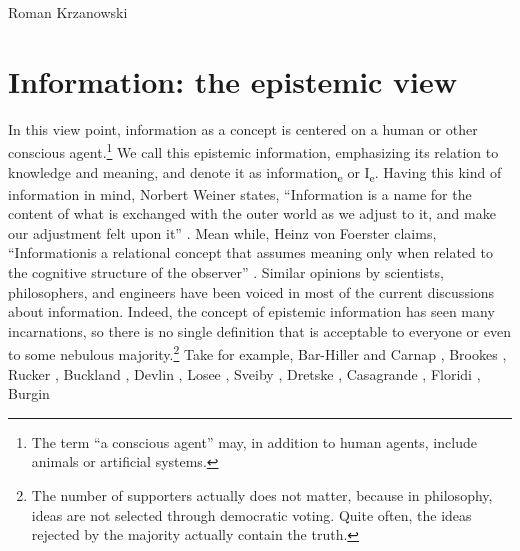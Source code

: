 \begin{artengenv}{Roman Krzanowski}
\section{Information: the epistemic view}
In this view point, information as a concept is centered on a human or other conscious agent.\footnote{The term ``a conscious agent'' may, in addition to human agents, include animals or artificial systems.} We call this epistemic information, emphasizing its relation to knowledge and meaning, and denote it as information\textsubscript{e} or I\textsubscript{e}. Having this kind of information in mind, Norbert Weiner states, ``Information is a name for the content of what is exchanged with the outer world as we adjust to it, and make our adjustment felt upon it''
\parencite[][p.17]{wiener_human_1989}. %
 Mean while, Heinz von Foerster claims, ``Informationis a relational concept that assumes meaning only when related to the cognitive structure of the observer'' 
\parencite[][p.3]{foerster_epistemology_1980}. %
 Similar opinions by scientists, philosophers, and engineers have been voiced in most of the current discussions about information. Indeed, the concept of epistemic information has seen many incarnations, so there is no single definition that is acceptable to everyone or even to some nebulous majority.\footnote{The number of supporters actually does not matter, because in philosophy, ideas are not selected through democratic voting. Quite often, the ideas rejected by the majority actually contain the truth.} Take for example, Bar-Hiller and Carnap 
\parencite*[][]{bar-hillel_semantic_1953}, %
 Brookes 
\parencite*[][]{brookes_foundations_1980}, %
 Rucker 
\parencite*[][]{rucker_mind_2013}, %
Buckland
\parencite*[][]{buckland_information_1991}, %
 Devlin 
\parencite*[][]{devlin_logic_1991}, %
 Losee 
\parencite*[][]{losee_discipline_1997}, %
 Sveiby 
\parencite*[][]{sveiby_what_1998}, %
 Dretske 
\parencite*[][]{dretske_knowledge_1999}, %
 Casagrande 
\parencite*[][]{casagrande_information_1999}, %
 Floridi 
\parencites*[][]{floridi_information_2010}[][]{floridi_philosophy_2010}, %
Burgin

\end{artengenv}
